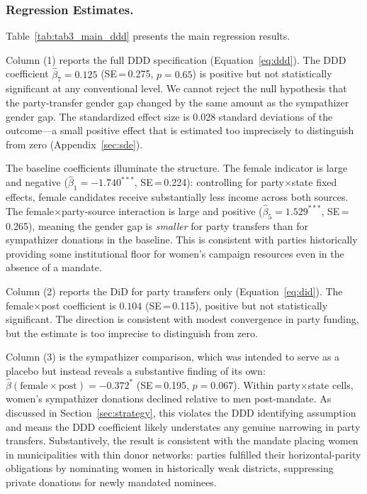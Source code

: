\documentclass[12pt]{article}
\begin{document}
\subsubsection*{Regression Estimates.}
Table~\ref{tab:tab3_main_ddd} presents the main regression results.



Column (1) reports the full DDD specification (Equation~\ref{eq:ddd}). The DDD coefficient $\hat{\beta}_7 = 0.125$ (SE\,=\,0.275, $p = 0.65$) is positive but not statistically significant at any conventional level. We cannot reject the null hypothesis that the party-transfer gender gap changed by the same amount as the sympathizer gender gap. The standardized effect size is 0.028 standard deviations of the outcome---a small positive effect that is estimated too imprecisely to distinguish from zero (Appendix~\ref{sec:sde}).

The baseline coefficients illuminate the structure. The female indicator is large and negative ($\hat{\beta}_1 = -1.740^{***}$, SE\,=\,0.224): controlling for party$\times$state fixed effects, female candidates receive substantially less income across both sources. The female$\times$party-source interaction is large and positive ($\hat{\beta}_5 = 1.529^{***}$, SE\,=\,0.265), meaning the gender gap is \emph{smaller} for party transfers than for sympathizer donations in the baseline. This is consistent with parties historically providing some institutional floor for women's campaign resources even in the absence of a mandate.

Column (2) reports the DiD for party transfers only (Equation~\ref{eq:did}). The female$\times$post coefficient is $0.104$ (SE\,=\,0.115), positive but not statistically significant. The direction is consistent with modest convergence in party funding, but the estimate is too imprecise to distinguish from zero.

Column (3) is the sympathizer comparison, which was intended to serve as a placebo but instead reveals a substantive finding of its own: $\hat{\beta}(\text{female} \times \text{post}) = -0.372^{*}$ (SE\,=\,0.195, $p = 0.067$). Within party$\times$state cells, women's sympathizer donations declined relative to men post-mandate. As discussed in Section~\ref{sec:strategy}, this violates the DDD identifying assumption and means the DDD coefficient likely understates any genuine narrowing in party transfers. Substantively, the result is consistent with the mandate placing women in municipalities with thin donor networks: parties fulfilled their horizontal-parity obligations by nominating women in historically weak districts, suppressing private donations for newly mandated nominees.
\end{document}
